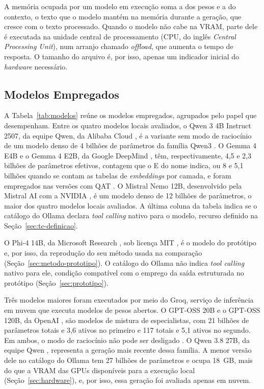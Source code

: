 A memória ocupada por um modelo em execução soma a dos pesos e a do contexto, o texto que o modelo mantém na memória durante a geração, que cresce com o texto processado. Quando o modelo não cabe na VRAM, parte dele é executada na unidade central de processamento (CPU, do inglês \textit{Central Processing Unit}), num arranjo chamado \textit{offload}, que aumenta o tempo de resposta. O tamanho do arquivo é, por isso, apenas um indicador inicial do \textit{hardware} necessário.

\subsection{Modelos Empregados}
\label{sec:modelos}

A Tabela~\ref{tab:modelos} reúne os modelos empregados, agrupados pelo papel que desempenham. Entre os quatro modelos locais avaliados, o Qwen 3 4B Instruct 2507, da equipe Qwen, da Alibaba Cloud \cite{qwen2025qwen34binstruct2507}, é a variante sem modo de raciocínio de um modelo denso de 4 bilhões de parâmetros da família Qwen3 \cite{qwen2025qwen3}. O Gemma 4 E4B e o Gemma 4 E2B, da Google DeepMind \cite{team2026gemma4}, têm, respectivamente, 4,5 e 2,3 bilhões de parâmetros efetivos, contagem que o E do nome indica, ou 8 e 5,1 bilhões quando se contam as tabelas de \textit{embeddings} por camada, e foram empregados nas versões com QAT \cite{google2026gemma4qat}. O Mistral Nemo 12B, desenvolvido pela Mistral AI com a NVIDIA \cite{mistral2024nemo}, é um modelo denso de 12 bilhões de parâmetros, o maior dos quatro modelos locais avaliados. A última coluna da tabela indica se o catálogo do Ollama declara \textit{tool calling} nativo para o modelo, recurso definido na Seção~\ref{sec:tc-definicao}.

O Phi-4 14B, da Microsoft Research \cite{abdin2024phi4}, sob licença MIT \cite{microsoft2024phi4card}, é o modelo do protótipo e, por isso, da reprodução do seu método usada na comparação (Seção~\ref{sec:metodo-prototipo}). O catálogo do Ollama não indica \textit{tool calling} nativo para ele, condição compatível com o emprego da saída estruturada no protótipo (Seção~\ref{sec:prototipo}).

Três modelos maiores foram executados por meio do Groq, serviço de inferência em nuvem que executa modelos de pesos abertos. O GPT-OSS 20B e o GPT-OSS 120B, da OpenAI \cite{openai2025gptoss}, são modelos de mistura de especialistas, com 21 bilhões de parâmetros totais e 3,6 ativos no primeiro e 117 totais e 5,1 ativos no segundo. Em ambos, o modo de raciocínio não pode ser desligado \cite{groq2026reasoning}. O Qwen 3.8 27B, da equipe Qwen \cite{qwen2026qwen38}, representa a geração mais recente dessa família. A menor versão dele no catálogo do Ollama tem 27 bilhões de parâmetros e ocupa 18~GB, mais do que a VRAM das GPUs disponíveis para a execução local (Seção~\ref{sec:hardware}), e, por isso, essa geração foi avaliada apenas em nuvem.

